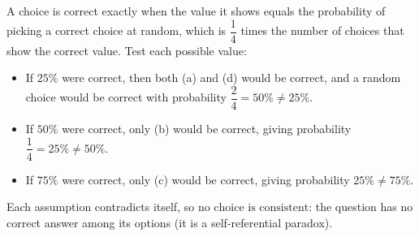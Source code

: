 A choice is correct exactly when the value it shows equals the probability of picking a correct choice at random, which is $\dfrac{1}{4}$ times the number of choices that show the correct value. Test each possible value:
\begin{itemize}
\item If $25\%$ were correct, then both (a) and (d) would be correct, and a random choice would be correct with probability $\dfrac{2}{4}=50\%\ne25\%$.
\item If $50\%$ were correct, only (b) would be correct, giving probability $\dfrac{1}{4}=25\%\ne50\%$.
\item If $75\%$ were correct, only (c) would be correct, giving probability $25\%\ne75\%$.
\end{itemize}
Each assumption contradicts itself, so $\boxed{\text{no choice is consistent}}$: the question has no correct answer among its options (it is a self-referential paradox).
